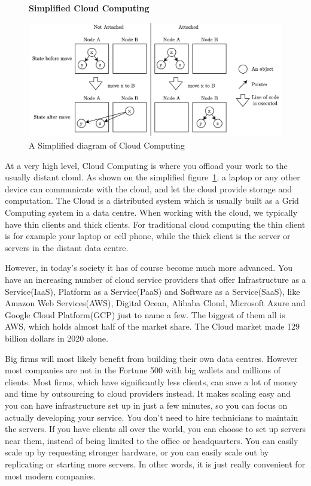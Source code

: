 \begin{figure}[t]
    \centering
    \textbf{Simplified Cloud Computing}\par\medskip
    \includegraphics[scale=0.7]{chapters/background/figures/emerald_attached.png}
    \caption{A Simplified diagram of Cloud Computing}
    \label{fig:SimplifiedCloudDiagram}
\end{figure}

At a very high level, Cloud Computing is where you offload your work to the usually distant cloud. As shown on the simplified figure~\ref{fig:SimplifiedCloudDiagram}, a laptop or any other device can communicate with the cloud, and let the cloud provide storage and computation. The Cloud is a distributed system which is usually built as a Grid Computing system in a data centre. When working with the cloud, we typically have thin clients and thick clients. For traditional cloud computing the thin client is for example your laptop or cell phone, while the thick client is the server or servers in the distant data centre.

However, in today's society it has of course become much more advanced. You have an increasing number of cloud service providers that offer Infrastructure as a Service(IaaS), Platform as a Service(PaaS) and Software as a Service(SaaS), like Amazon Web Services(AWS), Digital Ocean, Alibaba Cloud, Microsoft Azure and Google Cloud Platform(GCP) just to name a few. The biggest of them all is AWS, which holds almost half of the market share\cite{noauthor_cloud_2019}. The Cloud market made 129 billion dollars in 2020 alone\cite{noauthor_cloud_nodate}.

Big firms will most likely benefit from building their own data centres. However most companies are not in the Fortune 500 with big wallets and millions of clients. Most firms, which have significantly less clients, can save a lot of money and time by outsourcing to cloud providers instead. It makes scaling easy and you can have infrastructure set up in just a few minutes, so you can focus on actually developing your service. You don't need to hire technicians to maintain the servers. If you have clients all over the world, you can choose to set up servers near them, instead of being limited to the office or headquarters. You can easily scale up by requesting stronger hardware, or you can easily scale out by replicating or starting more servers. In other words, it is just really convenient for most modern companies.

